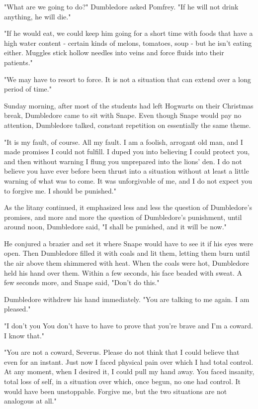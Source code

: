 "What are we going to do?" Dumbledore asked Pomfrey. "If he will not drink anything, he will die."

"If he would eat, we could keep him going for a short time with foods that have a high water content - certain kinds of melons, tomatoes, soup - but he isn't eating either. Muggles stick hollow needles into veins and force fluids into their patients."

"We may have to resort to force. It is not a situation that can extend over a long period of time."

Sunday morning, after most of the students had left Hogwarts on their Christmas break, Dumbledore came to sit with Snape. Even though Snape would pay no attention, Dumbledore talked, constant repetition on essentially the same theme.

"It is my fault, of course. All my fault. I am a foolish, arrogant old man, and I made promises I could not fulfill. I duped you into believing I could protect you, and then without warning I flung you unprepared into the lions' den. I do not believe you have ever before been thrust into a situation without at least a little warning of what was to come. It was unforgivable of me, and I do not expect you to forgive me. I should be punished."

As the litany continued, it emphasized less and less the question of Dumbledore's promises, and more and more the question of Dumbledore's punishment, until around noon, Dumbledore said, "I shall be punished, and it will be now."

He conjured a brazier and set it where Snape would have to see it if his eyes were open. Then Dumbledore filled it with coals and lit them, letting them burn until the air above them shimmered with heat. When the coals were hot, Dumbledore held his hand over them. Within a few seconds, his face beaded with sweat. A few seconds more, and Snape said, "Don't do this."

Dumbledore withdrew his hand immediately. "You are talking to me again. I am pleased."

"I don't{\el} you{\el} You don't have to have to prove that you're brave and I'm a coward. I know that."

"You are not a coward, Severus. Please do not think that I could believe that even for an instant. Just now I faced physical pain over which I had total control. At any moment, when I desired it, I could pull my hand away. You faced insanity, total loss of self, in a situation over which, once begun, no one had control. It would have been unstoppable. Forgive me, but the two situations are not analogous at all."

